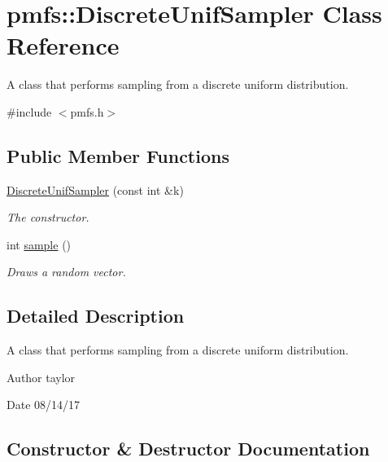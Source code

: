 \hypertarget{classpmfs_1_1DiscreteUnifSampler}{}\section{pmfs\+:\+:Discrete\+Unif\+Sampler Class Reference}
\label{classpmfs_1_1DiscreteUnifSampler}


A class that performs sampling from a discrete uniform distribution.  




{\ttfamily \#include $<$pmfs.\+h$>$}

\subsection*{Public Member Functions}
\begin{DoxyCompactItemize}
\item 
\hyperlink{classpmfs_1_1DiscreteUnifSampler_a28d1d017274aaf9e22db9cc655227592}{Discrete\+Unif\+Sampler} (const int \&k)
\begin{DoxyCompactList}\small\item\em The constructor. \end{DoxyCompactList}\item 
int \hyperlink{classpmfs_1_1DiscreteUnifSampler_a5fdb6cfffe456497b8e296a4d7721a13}{sample} ()
\begin{DoxyCompactList}\small\item\em Draws a random vector. \end{DoxyCompactList}\end{DoxyCompactItemize}


\subsection{Detailed Description}
A class that performs sampling from a discrete uniform distribution. 

\begin{DoxyAuthor}{Author}
taylor 
\end{DoxyAuthor}
\begin{DoxyDate}{Date}
08/14/17 
\end{DoxyDate}


\subsection{Constructor \& Destructor Documentation}
